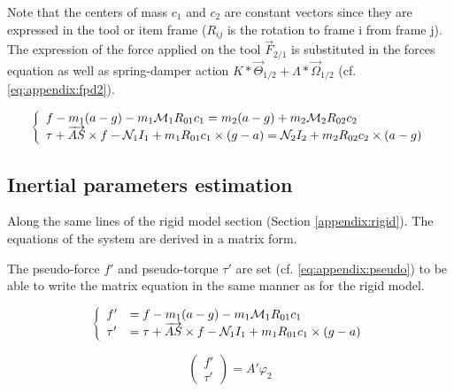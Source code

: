 \documentclass[\main/main.tex]{subfiles}
\begin{document}
Note that the centers of mass $c_1$ and $c_2$ are constant vectors since they are expressed in the tool or item frame ($R_{ij}$ is the rotation to frame i from frame j).  The expression of the force applied on the tool $\overrightarrow{F}_{2/1}$ is substituted in the forces equation as well as spring-damper action $K \ast \overrightarrow{\Theta}_{1/2} + \Lambda \ast \overrightarrow{\Omega}_{1/2}$ (cf. \ref{eq:appendix:fpd2}).

\begin{equation}
 \label{eq:appendix:fpd2}
 \left \{
 \begin{array}{l l}
  f - m_1 (a - g) -  m_1 \mathcal{M}_1 R_{01} c_1 = m_2 (a - g) + m_2 \mathcal{M}_2 R_{02} c_2 \\
  \tau + \overrightarrow{AS} \times f - \mathcal{N}_1 I_1 + m_1 R_{01} c_1 \times (g - a)
  = \mathcal{N}_2 I_2  + m_2 R_{02} c_2 \times  (a - g)
 \end{array}
 \right.
\end{equation}

\subsection{Inertial parameters estimation}
\label{appendix:msd:inertia_estimation}

Along the same lines of the rigid model section (Section \ref{appendix:rigid}). The equations of the system are derived in a matrix form.

The pseudo-force $f'$ and pseudo-torque $\tau'$ are set (cf. \ref{eq:appendix:pseudo}) to be able to write the matrix equation in the same manner as for the rigid model.

\begin{equation}
 \label{eq:appendix:pseudo}
 \left \{
 \begin{array}{l l}
   f' &= f - m_1 (a - g) -  m_1 \mathcal{M}_1 R_{01} c_1 \\
   \tau' &= \tau + \overrightarrow{AS} \times f - \mathcal{N}_1 I_1 + m_1 R_{01} c_1 \times (g - a)
    \end{array}
 \right.
\end{equation}

\begin{equation}
  \label{eq:appendix:rmsd_inertia_estimation}
\begin{pmatrix}
  f' \\ \tau'
\end{pmatrix} = A' \varphi_2
\end{equation}
\end{document}
